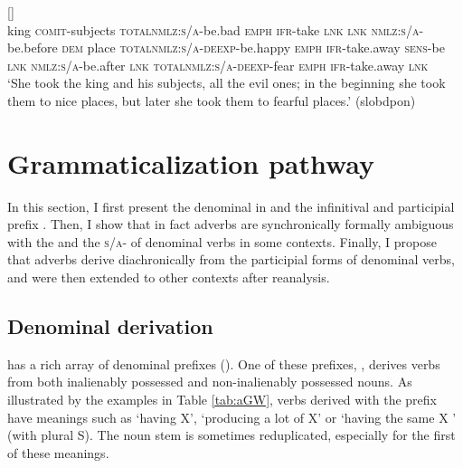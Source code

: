 \documentclass[output=paper]{langsci/langscibook}
\begin{document}
\begin{exe}
\ex \label{ex:kAGWNkhWNkhor}
\gll {}  	  	[]  	  	  	  	  	  	  	  	  	  	  	  	  	  	  	  	  	  	  \\
king \textsc{comit}-subjects \textsc{total}\tld{}\textsc{nmlz}:\textsc{s\slash a}-be.bad \textsc{emph} \textsc{ifr}-take \textsc{lnk}  \textsc{lnk} \textsc{nmlz}:\textsc{s\slash a}-be.before \textsc{dem} place \textsc{total}\tld{}\textsc{nmlz}:\textsc{s\slash a}-\textsc{deexp}-be.happy \textsc{emph} \textsc{ifr}-take.away \textsc{sens}-be \textsc{lnk} \textsc{nmlz}:\textsc{s\slash a}-be.after \textsc{lnk} \textsc{total}\tld{}\textsc{nmlz}:\textsc{s\slash a}-\textsc{deexp}-fear \textsc{emph} \textsc{ifr}-take.away \textsc{lnk} \\
\glt `She took the king and his subjects, all the evil ones; in the beginning she took them to nice places, but later she took them to fearful places.' (slobdpon)
\end{exe}


\section{Grammaticalization pathway} 
In this section, I first present the  denominal  in  and the infinitival and participial prefix . Then, I show that in fact  adverbs are synchronically formally ambiguous with the  and the \textsc{s\slash a}- of  denominal verbs in some contexts. Finally, I propose that  adverbs derive diachronically from the participial forms of  denominal verbs, and were then extended to other contexts after reanalysis.


\subsection{Denominal derivation}
 has a rich array of denominal prefixes (\citealt{jacques14antipassive}). One of these prefixes, , derives   verbs from both inalienably possessed and non-inalienably possessed nouns. As illustrated by the examples in Table \ref{tab:aGW}, verbs derived with the prefix have meanings such as `having X', `producing a lot of X' or `having the same X ' (with plural S). The noun stem is sometimes reduplicated, especially for the first of these meanings.
 
\end{document}
